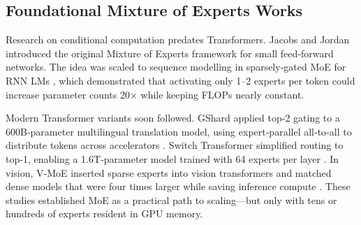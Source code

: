 \documentclass[12pt]{article}
\begin{document}
\subsection{Foundational Mixture of Experts Works}
Research on conditional computation predates Transformers. Jacobs and Jordan \cite{OriginalMoE1991} introduced the original Mixture of Experts framework for small feed‑forward networks. The idea was scaled to sequence modelling in sparsely‑gated MoE for RNN LMs \cite{SparselyGatedMoE2017}, which demonstrated that activating only 1–2 experts per token could increase parameter counts 20$\times$ while keeping FLOPs nearly constant.

Modern Transformer variants soon followed. GShard applied top‑2 gating to a 600B‑parameter multilingual translation model, using expert‑parallel all‑to‑all to distribute tokens across accelerators \cite{GShard2020}. Switch Transformer simplified routing to top‑1, enabling a 1.6T‑parameter model trained with 64 experts per layer \cite{SwitchTransformer2021}. In vision, V‑MoE inserted sparse experts into vision transformers and matched dense models that were four times larger while saving inference compute \cite{VMoE2021}. These studies established MoE as a practical path to scaling—but only with tens or hundreds of experts resident in GPU memory.
\end{document}
